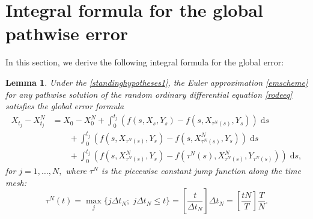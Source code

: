 \documentclass[reqno,12pt]{amsart}
\theoremstyle{plain} %
\newtheorem{lemma}{Lemma}[section]
\theoremstyle{definition} %
\begin{document}
\section{Integral formula for the global pathwise error}

In this section, we derive the following integral formula for the global error:
\begin{lemma}
    \label{lemglobalerrorintegralformula}
    Under the \cref{standinghypotheses1}, the Euler approximation \eqref{emscheme} for any pathwise solution of the random ordinary differential equation \eqref{rodeeq} satisfies the global error formula
    \begin{equation}
        \label{globalerrorintegralformula}
        \begin{aligned}
            X_{t_j} - X_{t_j}^N & = X_0 - X_0^N + \int_0^{t_j} \left( f(s, X_s, Y_s) - f(s, X_{\tau^N(s)}, Y_s) \right)\;\mathrm{d}s  \\ 
            & \qquad + \int_{0}^{t_j} \left( f(s, X_{\tau^N(s)}, Y_s) - f(s, X_{\tau^N(s)}^N, Y_s) \right)\;\mathrm{d}s \\
            & \qquad + \int_0^{t_j} \left( f(s, X_{\tau^N(s)}^N, Y_s) - f(\tau^N(s), X_{\tau^N(s)}^N, Y_{\tau^N(s)}) \right)\;\mathrm{d}s,
        \end{aligned}
    \end{equation}
    for $j = 1, \ldots, N,$ where $\tau^N$ is the piecewise constant jump function along the time mesh:
    \begin{equation}
        \label{tauNt}
        \tau^N(t) = \max_j\{j\Delta t_N; \; j\Delta t_N \leq t\} = \left[\frac{t}{\Delta t_N}\right]\Delta t_N = \left[\frac{tN}{T}\right]\frac{T}{N}.
    \end{equation}
\end{lemma}
\end{document}
